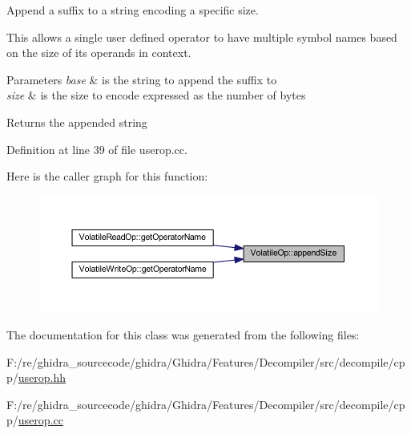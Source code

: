 Append a suffix to a string encoding a specific size. 

This allows a single user defined operator to have multiple symbol names based on the size of its operands in context. 
\begin{DoxyParams}{Parameters}
{\em base} & is the string to append the suffix to \\
\hline
{\em size} & is the size to encode expressed as the number of bytes \\
\hline
\end{DoxyParams}
\begin{DoxyReturn}{Returns}
the appended string 
\end{DoxyReturn}


Definition at line 39 of file userop.\+cc.

Here is the caller graph for this function\+:
\nopagebreak
\begin{figure}[H]
\begin{center}
\leavevmode
\includegraphics[width=350pt]{class_volatile_op_a49723e93482e3ece0899463711b2ba6b_icgraph}
\end{center}
\end{figure}


The documentation for this class was generated from the following files\+:\begin{DoxyCompactItemize}
\item 
F\+:/re/ghidra\+\_\+sourcecode/ghidra/\+Ghidra/\+Features/\+Decompiler/src/decompile/cpp/\mbox{\hyperlink{userop_8hh}{userop.\+hh}}\item 
F\+:/re/ghidra\+\_\+sourcecode/ghidra/\+Ghidra/\+Features/\+Decompiler/src/decompile/cpp/\mbox{\hyperlink{userop_8cc}{userop.\+cc}}\end{DoxyCompactItemize}
